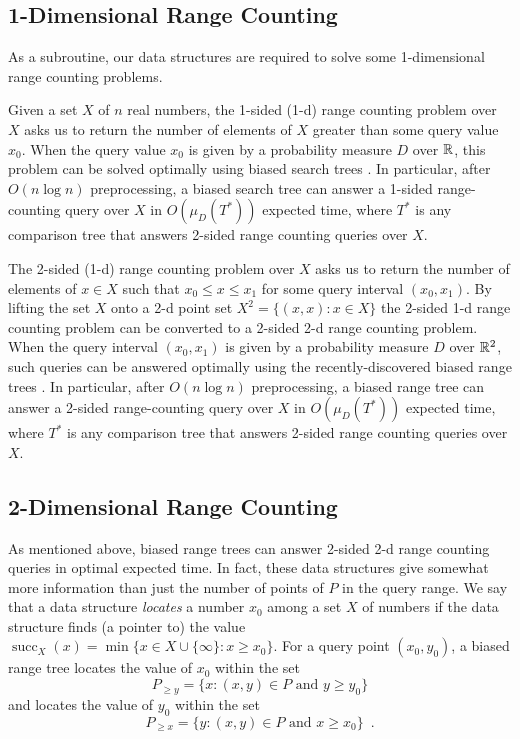 \documentclass{patmorin}
\DeclareMathOperator{\scc}{succ}
\begin{document}
\subsection{1-Dimensional Range Counting}

As a subroutine, our data structures are required to solve some
1-dimensional range counting problems.  

Given a set $X$ of $n$ real numbers, the 1-sided (1-d) range counting
problem over $X$ asks us to return the number of elements of $X$ greater
than some query value $x_0$.  When the query value $x_0$ is given by a
probability measure $D$ over $\mathbb{R}$, this problem can be solved optimally
using biased search trees \cite{X,X,X}.  In particular, after $O(n\log n)$
preprocessing, a biased search tree can answer a 1-sided range-counting
query over $X$ in $O(\mu_D(T^*))$ expected time, where $T^*$ is any
comparison tree that answers 2-sided range counting queries over $X$.

The 2-sided (1-d) range counting problem over $X$ asks us to return the
number of elements of $x\in X$ such that $x_0 \le x \le x_1$ for some query
interval $(x_0,x_1)$.  By lifting the set $X$ onto a 2-d point set
$X^2=\{(x,x): x\in X\}$ the 2-sided 1-d range counting problem can be
converted to a 2-sided 2-d range counting problem.  When the query interval
$(x_0,x_1)$ is given by a probability measure $D$ over $\mathbb{R}^2$, such queries
can be answered optimally using the recently-discovered biased range trees
\cite{dhm08}.  In particular, after $O(n\log n)$ preprocessing, a biased
range tree can answer a 2-sided range-counting query over $X$ in
$O(\mu_D(T^*))$ expected time, where $T^*$ is any comparison tree that
answers 2-sided range counting queries over $X$.

\subsection{2-Dimensional Range Counting}

As mentioned above, biased range trees can answer 2-sided 2-d range
counting queries in optimal expected time.  In fact, these data structures
give somewhat more information than just the number of points of $P$ in
the query range.  We say that a data structure \emph{locates} a number
$x_0$ among a set $X$ of numbers if the data structure finds (a pointer
to) the value $\scc_X(x) = \min\{ x\in X\cup \{\infty\}: x \ge x_0 \}$.
For a query point $(x_0,y_0)$, a biased range tree locates the value of
$x_0$ within the set
\[
    P_{\ge y} = \{x: \mbox{$(x,y)\in P$ and $y \ge y_0$}\} 
\]
and locates the value of $y_0$ within the set
\[ 
    P_{\ge x} = \{y : \mbox{$(x,y)\in P$ and $x \ge x_0$}\} \enspace .
\]
\end{document}
